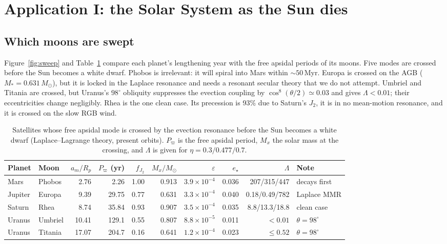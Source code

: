 \documentclass[11pt,a4paper]{article}
\newcommand{\estar}{e_\star}
\newcommand{\msun}{M_\odot}
\newcommand{\eps}{\varepsilon}
\newcommand{\fJ}{f_{J_2}}
\begin{document}
\section{Application I: the Solar System as the Sun dies}\label{sec:solar}

\subsection{Which moons are swept}

Figure~\ref{fig:sweep} and Table~\ref{tab:moons} compare each planet's lengthening year with the free apsidal periods of its moons. Five modes are crossed before the Sun becomes a white dwarf. Phobos is irrelevant: it will spiral into Mars within $\sim50$\,Myr. Europa is crossed on the AGB ($M_\ast=0.631\,\msun$), but it is locked in the Laplace resonance and needs a resonant secular theory that we do not attempt. Umbriel and Titania are crossed, but Uranus's $98^\circ$ obliquity suppresses the evection coupling by $\cos^8(\theta/2)\simeq0.03$ and gives $\Lambda<0.01$; their eccentricities change negligibly. Rhea is the one clean case. Its precession is 93\% due to Saturn's $J_2$, it is in no mean-motion resonance, and it is crossed on the slow RGB wind.

\begin{table}[t]
\centering
\caption{Satellites whose free apsidal mode is crossed by the evection resonance before the Sun becomes a white dwarf (Laplace--Lagrange theory, present orbits). $P_\varpi$ is the free apsidal period, $M_x$ the solar mass at the crossing, and $\Lambda$ is given for $\eta=0.3/0.477/0.7$.}
\label{tab:moons}
\small\setlength{\tabcolsep}{4pt}
\begin{tabular}{llrrrrrrrl}
\toprule
Planet & Moon & $a_m/R_p$ & $P_\varpi$ (yr) & $\fJ$ & $M_x/\msun$ & $\eps$ & $\estar$ & $\Lambda$ & Note \\
\midrule
Mars    & Phobos   & 2.76  & 2.26   & 1.00 & 0.913 & $3.9\times10^{-4}$ & 0.036 & 207/315/447 & decays first \\
Jupiter & Europa   & 9.39  & 29.75  & 0.77 & 0.631 & $3.3\times10^{-4}$ & 0.040 & 0.18/0.49/782 & Laplace MMR \\
Saturn  & Rhea     & 8.74  & 35.84  & 0.93 & 0.907 & $3.5\times10^{-4}$ & 0.035 & 8.8/13.3/18.8 & clean case \\
Uranus  & Umbriel  & 10.41 & 129.1  & 0.55 & 0.807 & $8.8\times10^{-5}$ & 0.011 & $<0.01$ & $\theta=98^\circ$ \\
Uranus  & Titania  & 17.07 & 204.7  & 0.16 & 0.641 & $1.2\times10^{-4}$ & 0.023 & $\le0.52$ & $\theta=98^\circ$ \\
\bottomrule
\end{tabular}
\end{table}
\end{document}
